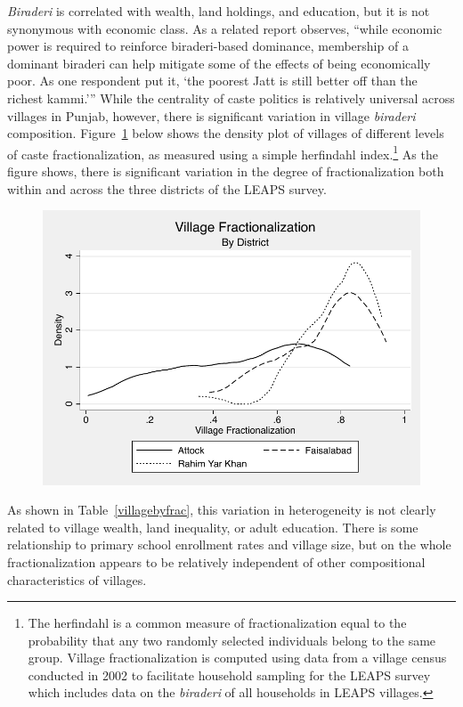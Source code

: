 \documentclass[Eubank_pk_ethnic_sorting.tex]{subfiles}
\begin{document}
\emph{Biraderi} is correlated with wealth, land holdings, and education, but it is not synonymous with economic class. As a related report observes, ``while economic power is required to reinforce biraderi-based dominance, membership of a dominant biraderi can help mitigate some of the effects of being economically poor. As one respondent put it, `the poorest Jatt is still better off than the richest kammi.''' \citep[p. 13]{Gazdar:2007vt} 
While the centrality of caste politics is relatively universal across villages in Punjab, however, there is significant variation in village \emph{biraderi} composition. Figure~\ref{fracdensities} below shows the density plot of villages of different levels of caste fractionalization, as measured using a simple herfindahl index.\footnote{The herfindahl is a common measure of fractionalization equal to the probability that any two randomly selected individuals belong to the same group. Village fractionalization is computed using data from a village census conducted in 2002 to facilitate household sampling for the LEAPS survey which includes data on the \emph{biraderi} of all households in LEAPS villages.} As the figure shows, there is significant variation in the degree of fractionalization both within and across the three districts of the LEAPS survey.

\begin{figure}[htb]
	\begin{center}
	\caption{}\label{fracdensities}
	\includegraphics[scale=1.0]{../graphs/village_frac_by_district.pdf}
	\end{center}
\end{figure}

As shown in Table~\ref{villagebyfrac}, this variation in heterogeneity is not clearly related to village wealth, land inequality, or adult education. There is some relationship to primary school enrollment rates and village size, but on the whole fractionalization appears to be relatively independent of other compositional characteristics of villages.


\end{document}
